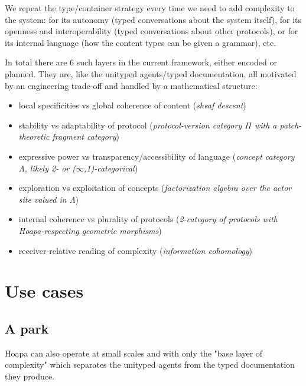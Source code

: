 \documentclass[11pt]{article}
\begin{document}
We repeat the type/container strategy every time we need to add complexity to the system: for its autonomy (typed conversations about the system itself), for its openness and interoperability (typed conversations about other protocols), or for its internal language (how the content types can be given a grammar), etc.

In total there are 6 such layers in the current framework, either encoded or planned. They are, like the unityped agents/typed documentation, all motivated by an engineering trade-off and handled by a mathematical structure:

\begin{itemize}

\item local specificities vs global coherence of content (\emph{sheaf descent})

\item stability vs adaptability of protocol (\emph{protocol-version category \ensuremath{\Pi} with a patch-theoretic fragment category})

\item expressive power vs transparency/accessibility of language (\emph{concept category \ensuremath{\Lambda}, likely 2- or (\ensuremath{\infty},1)-categorical})

\item exploration vs exploitation of concepts (\emph{factorization algebra over the actor site valued in \ensuremath{\Lambda}})

\item internal coherence vs plurality of protocols (\emph{2-category of protocols with Hoapa-respecting geometric morphisms})

\item receiver-relative reading of complexity (\emph{information cohomology})

\end{itemize}

\section{Use cases}

\subsection{A park}

Hoapa can also operate at small scales and with only the "base layer of complexity" which separates the unityped agents from the typed documentation they produce.
\end{document}
